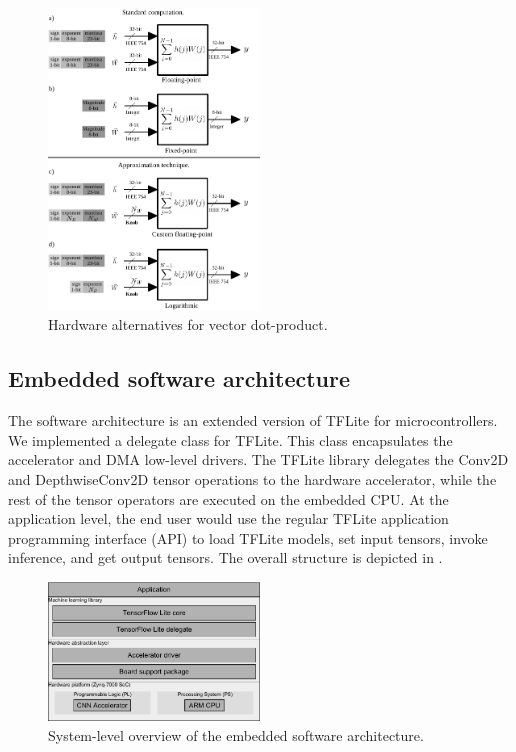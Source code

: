 \begin{figure}[t!]
	\centering
	\includegraphics[width=0.5\textwidth]{../figures/dot-product_unit.pdf}
	\caption{Hardware alternatives for vector dot-product.}
	\label{fig:dot_product}
\end{figure}


\subsection{Embedded software architecture}
The software architecture is an extended version of TFLite for microcontrollers\cite{TensorFlowLibrary}. We implemented a delegate class for TFLite. This class encapsulates the accelerator and DMA low-level drivers. The TFLite library delegates the  Conv2D and DepthwiseConv2D tensor operations to the hardware accelerator, while the rest of the tensor operators are executed on the embedded CPU. At the application level, the end user would use the regular TFLite application programming interface (API) to load TFLite models, set input tensors, invoke inference, and get output tensors. The overall structure is depicted in .

\begin{figure}[t!]
	\centering
	\includegraphics[width=0.5\textwidth]{../figures/sw_stack.pdf}
	\caption{System-level overview of the embedded software architecture.}
	\label{fig:sw_stack}
\end{figure}
